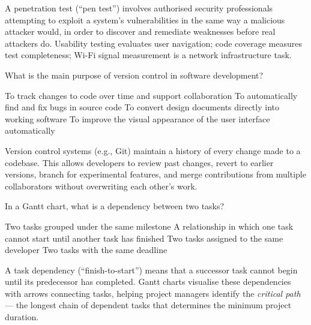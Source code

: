 \documentclass[answers]{exam}
\begin{document}
\begin{questions}
\begin{solution}
    A penetration test (``pen test'') involves authorised security professionals attempting to exploit a system's vulnerabilities in the same way a malicious attacker would, in order to discover and remediate weaknesses before real attackers do.
    Usability testing evaluates user navigation; code coverage measures test completeness; Wi-Fi signal measurement is a network infrastructure task.
\end{solution}

\question What is the main purpose of version control in software development?

\begin{choices}
    \correctchoice To track changes to code over time and support collaboration
    \choice To automatically find and fix bugs in source code
    \choice To convert design documents directly into working software
    \choice To improve the visual appearance of the user interface automatically
\end{choices}

\begin{solution}
    Version control systems (e.g., Git) maintain a history of every change made to a codebase.
    This allows developers to review past changes, revert to earlier versions, branch for experimental features, and merge contributions from multiple collaborators without overwriting each other's work.
\end{solution}

\question In a Gantt chart, what is a dependency between two tasks?

\begin{choices}
    \choice Two tasks grouped under the same milestone
    \correctchoice A relationship in which one task cannot start until another task has finished
    \choice Two tasks assigned to the same developer
    \choice Two tasks with the same deadline
\end{choices}

\begin{solution}
    A task dependency (``finish-to-start'') means that a successor task cannot begin until its predecessor has completed.
    Gantt charts visualise these dependencies with arrows connecting tasks, helping project managers identify the \textit{critical path} --- the longest chain of dependent tasks that determines the minimum project duration.
\end{solution}


\end{questions}
\end{document}
